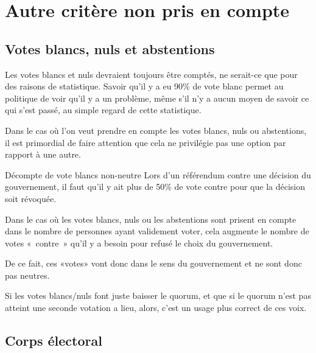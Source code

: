 \documentclass[../report]{subfiles}
\begin{document}


  \section{Autre critère non pris en compte}
  \subsection{Votes blancs, nuls et abstentions}

  Les votes blancs et nuls devraient toujours être comptés, ne serait-ce que pour des raisons de
  statistique.
  Savoir qu'il y a eu 90\% de vote blanc permet au politique de voir qu'il y a un problème, même
  s'il n'y a aucun moyen de savoir ce qui s'est passé, au simple regard de cette statistique.

  Dans le cas où l'on veut prendre en compte les votes blancs, nuls ou abstentions, il est primordial
  de faire attention que cela ne privilégie pas une option par rapport à une autre.

  \begin{nota}{Décompte de vote blancs non-neutre}
    Lors d'un référendum contre une décision du gouvernement, il faut qu'il y ait plus de 50\% 
    de vote contre pour que la décision soit révoquée.

    Dans le cas où les votes blancs, nuls ou les abstentions sont prisent en compte dans 
    le nombre de personnes ayant validement voter, cela augmente le nombre de votes «~contre~» 
    qu'il y a besoin pour refusé le choix du gouvernement.

    De ce fait, ces «votes» vont donc dans le sens du gouvernement et ne sont donc pas neutres. 

    Si les votes blancs/nuls font juste baisser le quorum, et que si le quorum n'est pas atteint
    une seconde votation a lieu, alors, c'est un usage plus correct de ces voix.

  \end{nota}


  \subsection{Corps électoral}
\end{document}
